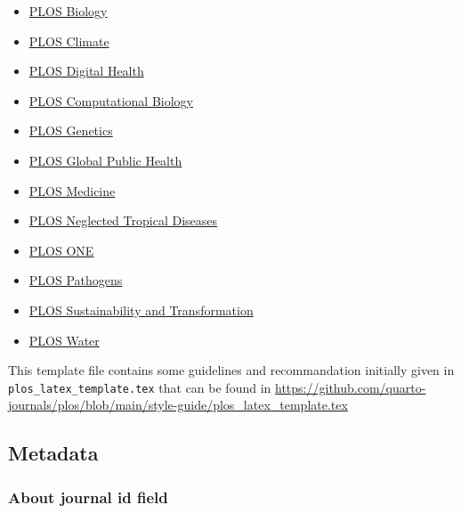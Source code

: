 \documentclass[
  10pt,
  letterpaper,
]{article}
\providecommand{\tightlist}{%
  \setlength{\itemsep}{0pt}\setlength{\parskip}{0pt}}\usepackage{longtable,booktabs,array}
\begin{document}
\begin{itemize}
\tightlist
\item
  \href{https://journals.plos.org/plosbiology/s/submission-guidelines}{PLOS
  Biology}
\item
  \href{https://journals.plos.org/climate/s/submission-guidelines}{PLOS
  Climate}
\item
  \href{https://journals.plos.org/digitalhealth/s/submission-guidelines}{PLOS
  Digital Health}
\item
  \href{https://journals.plos.org/ploscompbiol/s/submission-guidelines}{PLOS
  Computational Biology}
\item
  \href{https://journals.plos.org/plosgenetics/s/submission-guidelines}{PLOS
  Genetics}
\item
  \href{https://journals.plos.org/globalpublichealth/s/submission-guidelines}{PLOS
  Global Public Health}
\item
  \href{https://journals.plos.org/plosmedicine/s/submission-guidelines}{PLOS
  Medicine}
\item
  \href{https://journals.plos.org/plosntds/s/submission-guidelines}{PLOS
  Neglected Tropical Diseases}
\item
  \href{https://journals.plos.org/plosone/s/submission-guidelines}{PLOS
  ONE}
\item
  \href{https://journals.plos.org/plospathogens/s/submission-guidelines}{PLOS
  Pathogens}
\item
  \href{https://journals.plos.org/sustainabilitytransformation/s/submission-guidelines}{PLOS
  Sustainability and Transformation}
\item
  \href{https://journals.plos.org/water/s/submission-guidelines}{PLOS
  Water}
\end{itemize}

This template file contains some guidelines and recommandation initially
given in \texttt{plos\_latex\_template.tex} that can be found in
\url{https://github.com/quarto-journals/plos/blob/main/style-guide/plos_latex_template.tex}

\hypertarget{metadata}{%
\subsection{Metadata}\label{metadata}}

\hypertarget{about-journal-id-field}{%
\subsubsection{About journal id field}\label{about-journal-id-field}}
\end{document}
